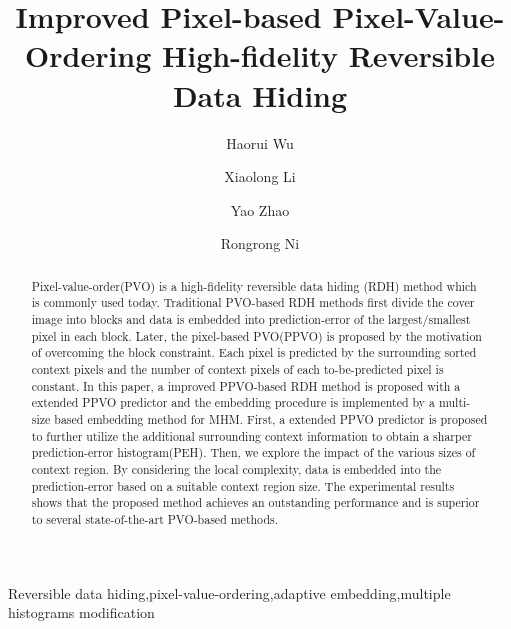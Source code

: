 \documentclass[review,3p,10pt,sort&compress]{elsarticle}
\begin{document}
\begin{frontmatter}

\title {Improved Pixel-based Pixel-Value-Ordering High-fidelity Reversible Data Hiding}

\author{Haorui Wu}

\author{Xiaolong Li}

\author{Yao Zhao}

\author{Rongrong Ni}

\address[mymainaddress]{Institute of Information Science, Beijing Jiaotong University, Beijing 100044, China}
\address[mysecondaryaddress]{Beijing Key Laboratory of Advanced Information Science and Network Technology, Beijing 100044, China}

\begin{abstract}
Pixel-value-order(PVO) is a high-fidelity reversible data hiding (RDH) method which is commonly used today. Traditional PVO-based RDH methods first divide the cover image into blocks and data is embedded into prediction-error of the largest/smallest pixel in each block. Later, the pixel-based PVO(PPVO) is proposed by the motivation of overcoming the block constraint. Each pixel is predicted by the surrounding sorted context pixels and the number of context pixels of each to-be-predicted pixel is constant. In this paper, a improved PPVO-based RDH method is proposed with a extended PPVO predictor and the embedding procedure is implemented by a multi-size based embedding method for MHM. First, a extended PPVO predictor is proposed to further utilize the additional surrounding context information to obtain a sharper prediction-error histogram(PEH). Then, we explore the impact of the various sizes of context region. By considering the local complexity, data is embedded into the prediction-error based on a suitable context region size. The experimental results shows that the proposed method achieves an outstanding performance and is superior to several state-of-the-art PVO-based methods.
\end{abstract}


\begin{keyword}
   Reversible data hiding\sep pixel-value-ordering\sep adaptive embedding\sep multiple histograms modification
\end{keyword}

\end{frontmatter}
\end{document}
